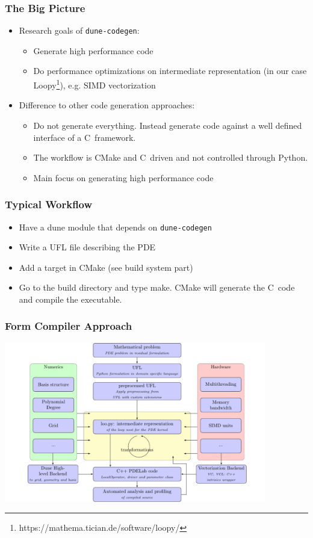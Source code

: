 \documentclass[ignorenonframetext,11pt]{beamer}
\theoremstyle{definition}
\def\CC{{C\nolinebreak[4]\hspace{-.05em}\raisebox{.4ex}{\tiny\bf ++}}}
\begin{document}
\begin{frame}[fragile]
  \frametitle{The Big Picture}
  \begin{itemize}
  \item Research goals of \lstinline{dune-codegen}:
    \begin{itemize}
    \item Generate high performance code
    \item Do performance optimizations on intermediate representation (in our
      case Loopy\footnote{https://mathema.tician.de/software/loopy/}),
      e.g. SIMD vectorization
    \end{itemize}
  \item Difference to other code generation approaches:
    \begin{itemize}
    \item Do not generate everything. Instead generate code against a well
      defined interface of a \CC\ framework.
    \item The workflow is CMake and \CC\ driven and not controlled through
      Python.
    \item Main focus on generating high performance code
    \end{itemize}
  \end{itemize}
\end{frame}

\begin{frame}
  \frametitle{Typical Workflow}
  \begin{itemize}
  \item Have a dune module that depends on \lstinline{dune-codegen}
  \item Write a UFL file describing the PDE
  \item Add a target in CMake (see build system part)
  \item Go to the build directory and type make. CMake will generate the \CC\
    code and compile the executable.
  \end{itemize}
\end{frame}

\begin{frame}
 \frametitle{Form Compiler Approach}
 \centering
 \includegraphics[width=4.5in]{figures/approach.pdf}
\end{frame}
\end{document}
